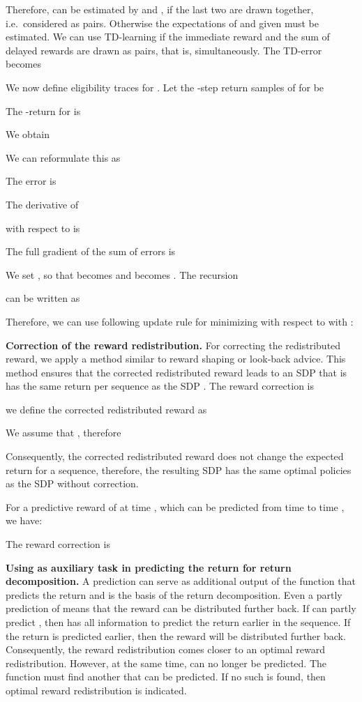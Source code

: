 \documentclass{article}
\begin{document}
\begin{appendices}
Therefore,  can be estimated by  and , 
if the last two are drawn together, 
i.e.\ considered as pairs. 
Otherwise the expectations of  and  given
 must be estimated.
We can use TD-learning if the immediate reward and 
the sum of delayed rewards are drawn as pairs, that is, simultaneously.  
The TD-error  becomes
  

We now define eligibility traces for .
Let the -step return samples of  for  be
  
The -return for  is
  
We obtain
  
We can reformulate this as
  
The  error  is
  
The derivative of 
  
with respect to  is
  

The full gradient of the sum of  errors is
 
We set , so that  becomes  and  becomes 
.
The recursion
  
can be written as
  

Therefore, we can use following update rule for minimizing 
 with respect to  with
:
  


{\bf Correction of the reward redistribution.}
For correcting the redistributed reward, we apply 
a method similar to reward shaping or look-back advice.
This method ensures that the corrected redistributed reward 
leads to an SDP that is has the same return per sequence as the
SDP .
The reward correction is 

we define the corrected redistributed reward as

We assume that , therefore
 
Consequently, the corrected redistributed reward  does not
change the expected return for a sequence, therefore, the resulting SDP has the
same optimal policies as the SDP without correction. 


For a predictive reward of  at time , which
can be predicted from time  to time , we have:

The reward correction is


{\bf Using  as auxiliary task 
in predicting the return for return decomposition.}
A  prediction can serve as additional output of 
the function  that predicts the return and
is the basis of the return decomposition. 
Even a partly prediction of  means that 
the reward can be distributed further back. 
If  can partly predict , then 
has all information to predict the return earlier in the 
sequence. If the return is predicted 
earlier, then the reward will be distributed further back.
Consequently, the reward redistribution 
comes closer to an optimal reward redistribution.
However, at the same time,  can no longer be predicted.  
The function  must find another  that can be predicted.
If no such  is found, then optimal reward redistribution is
indicated.




\end{appendices}
\end{document}
